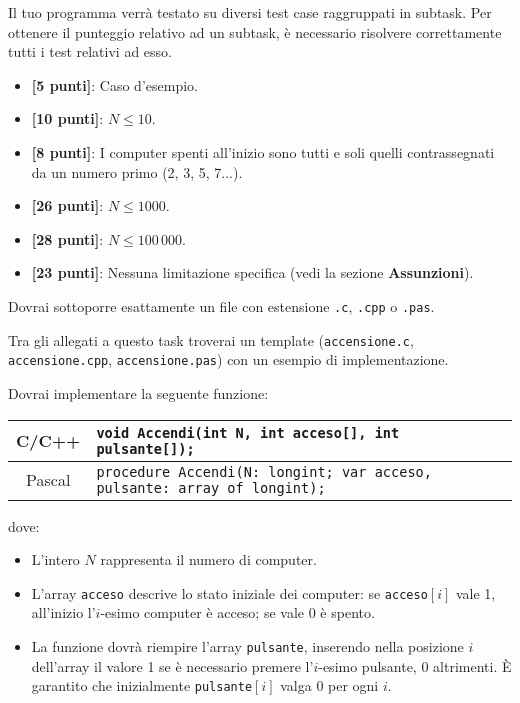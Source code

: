 \Scoring
Il tuo programma verrà testato su diversi test case raggruppati in subtask.
Per ottenere il punteggio relativo ad un subtask, è necessario risolvere
correttamente tutti i test relativi ad esso.

\begin{itemize}[nolistsep,itemsep=2mm]
  \item \textbf{ [5 punti]}: Caso d'esempio.
  \item \textbf{ [10 punti]}: $N \le 10$.
  \item \textbf{ [8 punti]}: I computer spenti all'inizio sono tutti e soli quelli contrassegnati da un numero primo (2, 3, 5, 7...).
  \item \textbf{ [26 punti]}: $N \le 1000$.
  \item \textbf{ [28 punti]}: $N \le 100\,000$.
  \item \textbf{ [23 punti]}: Nessuna limitazione specifica (vedi la sezione \textbf{Assunzioni}).
\end{itemize}


\Implementation
Dovrai sottoporre esattamente un file con estensione \texttt{.c}, \texttt{.cpp} o \texttt{.pas}.

\begin{warning}
Tra gli allegati a questo task troverai un template (\texttt{accensione.c}, \texttt{accensione.cpp}, \texttt{accensione.pas}) con un esempio di implementazione.
\end{warning}

Dovrai implementare la seguente funzione:
\begin{center}\begin{tabularx}{\textwidth}{|c|X|}
\hline
C/C++  & \verb|void Accendi(int N, int acceso[], int pulsante[]);|\\
\hline
Pascal & \verb|procedure Accendi(N: longint; var acceso, pulsante: array of longint);|\\
\hline
\end{tabularx}\end{center}
dove:
\begin{itemize}[nolistsep]
  \item L'intero $N$ rappresenta il numero di computer.
  \item L'array \texttt{acceso} descrive lo stato iniziale dei computer: se \texttt{acceso}$[i]$ vale 1, all'inizio l'$i$-esimo computer è acceso; se vale 0 è spento.
  \item La funzione dovrà riempire l'array \texttt{pulsante}, inserendo nella posizione $i$ dell'array il valore 1 se è necessario premere l'$i$-esimo pulsante, 0 altrimenti. È garantito che inizialmente \texttt{pulsante}$[i]$ valga 0 per ogni $i$.
\end{itemize}

